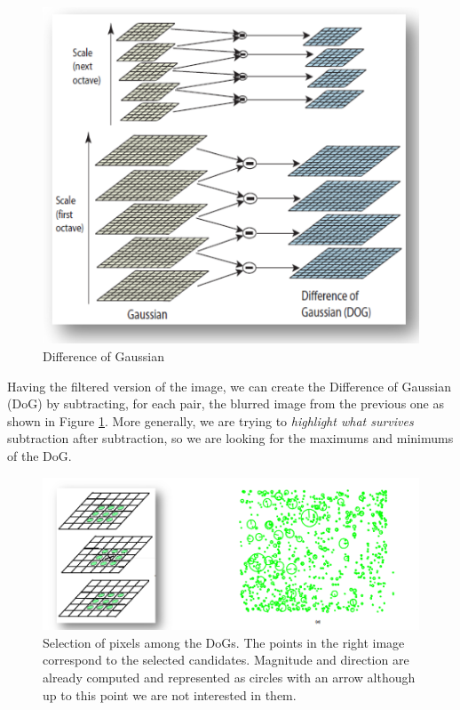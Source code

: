 \begin{figure}[H]
    \centering
    \includegraphics[scale=0.5]{Figures/dog.png}
    \caption{Difference of Gaussian}
    \label{fig:dog}
\end{figure}

Having the filtered version of the image, we can create the Difference of Gaussian (DoG) by subtracting, for each pair, the blurred image from the previous one as shown in Figure \ref{fig:dog}.
More generally, we are trying to \textit{highlight what survives} subtraction after subtraction, so we are looking for the maximums and minimums of the DoG.

\begin{figure}[H]
    \centering
    \includegraphics[scale=0.4]{Figures/dogs2.png}
    \caption{Selection of pixels among the DoGs. The points in the right image correspond to the selected candidates. Magnitude and direction are already computed and represented as circles with an arrow although up to this point we are not interested in them.}
    \label{fig:dogs2}
\end{figure}

